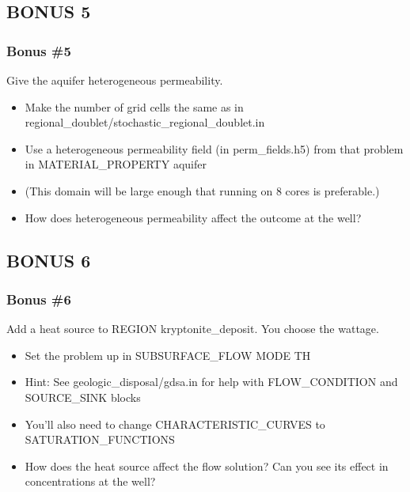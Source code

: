 \documentclass{beamer}
\begin{document}
\subsection{BONUS 5}

\begin{frame}[fragile]\frametitle{Bonus \#5}
Give the aquifer heterogeneous permeability.

\begin{itemize}
  \item Make the number of grid cells the same as in regional\_doublet/stochastic\_regional\_doublet.in
  \item Use a heterogeneous permeability field (in perm\_fields.h5) from that problem in MATERIAL\_PROPERTY aquifer
  \item (This domain will be large enough that running on 8 cores is preferable.)
  \item How does heterogeneous permeability affect the outcome at the well?
\end{itemize}

\end{frame}

\subsection{BONUS 6}

\begin{frame}[fragile]\frametitle{Bonus \#6}
Add a heat source to REGION kryptonite\_deposit. You choose the wattage.

\begin{itemize}
  \item Set the problem up in SUBSURFACE\_FLOW MODE TH
  \item Hint: See geologic\_disposal/gdsa.in for help with FLOW\_CONDITION and SOURCE\_SINK blocks
  \item You'll also need to change CHARACTERISTIC\_CURVES to SATURATION\_FUNCTIONS
  \item How does the heat source affect the flow solution? Can you see its effect in concentrations at the well?
\end{itemize}

\end{frame}

\end{document}
